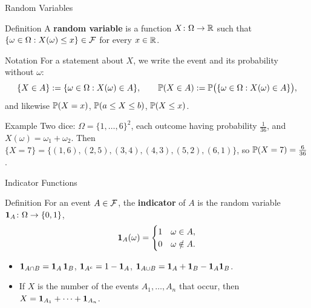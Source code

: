 \begin{frame}{Random Variables}
  \small
  \begin{block}{Definition}
    A \textbf{random variable} is a function $X\colon\Omega\to\mathbb{R}$ such that $\{\omega\in\Omega : X(\omega)\le x\}\in\mathcal{F}$ for every $x\in\mathbb{R}$.
  \end{block}
  \begin{block}{Notation}
    For a statement about $X$, we write the event and its probability without $\omega$:
    \[
      \{X\in A\}:=\{\omega\in\Omega : X(\omega)\in A\},\qquad
      \mathbb{P}(X\in A):=\mathbb{P}\big(\{\omega\in\Omega : X(\omega)\in A\}\big),
    \]
    and likewise $\mathbb{P}(X=x)$, $\mathbb{P}(a\le X\le b)$, $\mathbb{P}(X\le x)$.
  \end{block}
  \begin{block}{Example}
    Two dice: $\Omega=\{1,\dots,6\}^2$, each outcome having probability $\tfrac1{36}$, and $X(\omega)=\omega_1+\omega_2$.
    Then $\{X=7\}=\{(1,6),(2,5),(3,4),(4,3),(5,2),(6,1)\}$, so $\mathbb{P}(X=7)=\tfrac{6}{36}$.
  \end{block}
\end{frame}

\begin{frame}{Indicator Functions}
  \begin{block}{Definition}
    For an event $A\in\mathcal{F}$, the \textbf{indicator} of $A$ is the random variable $\mathbf{1}_A\colon\Omega\to\{0,1\}$,
    \[
      \mathbf{1}_A(\omega)=\begin{cases}1 & \omega\in A,\\ 0 & \omega\notin A.\end{cases}
    \]
  \end{block}
  \begin{itemize}
    \item $\mathbf{1}_{A\cap B}=\mathbf{1}_A\,\mathbf{1}_B$, \qquad $\mathbf{1}_{A^c}=1-\mathbf{1}_A$, \qquad $\mathbf{1}_{A\cup B}=\mathbf{1}_A+\mathbf{1}_B-\mathbf{1}_A\mathbf{1}_B$.
    \item If $X$ is the number of the events $A_1,\dots,A_n$ that occur, then $X=\mathbf{1}_{A_1}+\dots+\mathbf{1}_{A_n}$.
  \end{itemize}
\end{frame}

